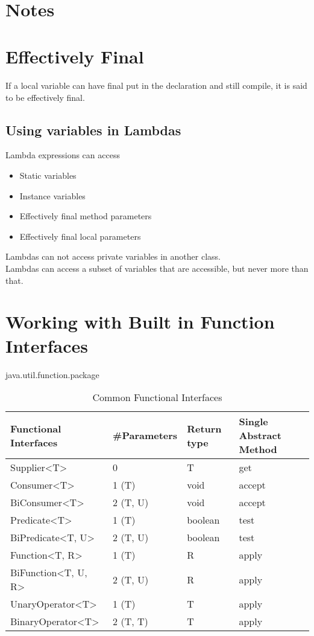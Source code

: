 \documentclass[12pt]{article}
\begin{document}
\
\section*{Notes}


\section{Effectively Final}
If a local variable can have final put in the declaration and still compile, it is said to be effectively final.
\subsection{Using variables in Lambdas } 
Lambda expressions can access 
\begin{itemize}
	\item Static variables
	\item Instance variables
	\item Effectively final method parameters
	\item Effectively final local parameters
\end{itemize}
Lambdas can not access private variables in another class. 
\\Lambdas can access a subset of variables that are accessible, but never more than that.
\clearpage

\section{Working with Built in Function Interfaces } 
java.util.function.package
\\

\begin{table}[ht]
\caption{Common Functional Interfaces}	%
\begin{tabular}{llll}							%
\hline\hline										%
Functional Interfaces & \#Parameters & Return type & Single Abstract Method \\ [.5ex]
\hline																%
Supplier<T>			& 0			& T			& get	  	\\			%
Consumer<T>			& 1 (T) 	& void		& accept  	\\ [1ex]	%
BiConsumer<T>		& 2 (T, U) 	& void		& accept	\\
Predicate<T>		& 1 (T)		& boolean	& test		\\
BiPredicate<T, U>	& 2 (T, U)	& boolean	& test		\\
Function<T, R>		& 1 (T)		& R			& apply		\\
BiFunction<T, U, R> & 2 (T, U)	& R			& apply		\\
UnaryOperator<T>	& 1 (T)		& T			& apply		\\
BinaryOperator<T>	& 2 (T, T)	& T			& apply		\\
\hline																%
\end{tabular}	
\label{table:nonlin}												%
\end{table}
\end{document}
